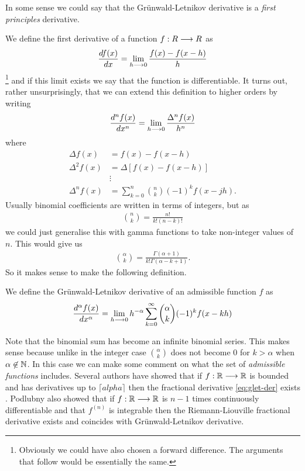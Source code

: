 In some sense we could say that the Gr{\"u}nwald-Letnikov derivative is a \emph{first principles} derivative. 

We define the first derivative of a function $ f : R \longrightarrow R $ as 
\begin{align}
	\frac{df(x)}{dx} = \lim_{h\longrightarrow 0} \frac{f(x)-f(x-h)}{h}
\end{align}\footnote{Obviously we could have also chosen a forward difference. The arguments that follow would be essentially the same.} 
and if this limit exists we say that the function is differentiable. It turns out, rather unsurprisingly, that we can extend this definition to higher orders by writing
\begin{align}
	\frac{d^nf(x)}{dx^n} = \lim_{h\longrightarrow0} \frac{\Delta^n f(x)}{h^n}
\end{align}
where
\begin{align}
	\Delta f(x) &= f(x) - f(x-h) \\
	\Delta^2 f(x) &= \Delta[f(x) - f(x-h)] \\
	&\vdots \\
	\Delta^n f(x) &= \sum_{k=0}^n {n\choose k} (-1)^kf(x-jh).
\end{align}
Usually binomial coefficients are written in terms of integers, but as
\begin{align}
	{n \choose k } = \frac{n!}{k!(n-k)!}
\end{align}
we could just generalise this with gamma functions to take non-integer values of $ n $.
This would give us
\begin{align}
	{ \alpha \choose k } = \frac{\Gamma(\alpha + 1)}{k! \Gamma(\alpha - k + 1)}.
\end{align}
So it makes sense to make the following definition.
\begin{mdframed}[innertopmargin=10pt]
	\begin{definition}
		We define the Gr{\"u}nwald-Letnikov derivative of an admissible function $ f $ as
		\begin{align}
			\label{eq:glet-der}
			\frac{d^\alpha f(x)}{dx^\alpha} = \lim_{h \longrightarrow 0} h^{-\alpha} \sum_{k=0}^\infty {\alpha \choose k} (-1)^k f(x - kh)
		\end{align}
	\end{definition}
\end{mdframed}
Note that the binomial sum has become an infinite binomial series. This makes sense because unlike in the integer case $ { \alpha \choose k } $ does not become $ 0 $ for $ k > \alpha $ when $ \alpha \not\in \mathbb{N} $.
In this case we can make some comment on what the set of \emph{admissible functions} includes. Several authors have showed that if $ f : \mathbb{R} \longrightarrow \mathbb{R} $ is bounded and has derivatives up to $ \lceil alpha \rceil $ then the fractional derivative \eqref{eq:glet-der} exists \cite{Meerschaert2011, Podlubny1999}. 
Podlubny also showed that if $ f : \mathbb{R} \longrightarrow \mathbb{R} $ is $ n - 1 $ times continuously differentiable and that $ f^{(n)} $ is integrable then the Riemann-Liouville fractional derivative exists and coincides with Gr{\"u}nwald-Letnikov derivative. 


\clearpage
